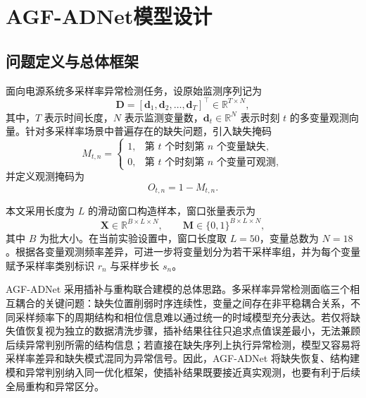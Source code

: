 \documentclass[bachelor, vlined]{DissertUESTC}
\begin{document}
    \chapter{AGF-ADNet模型设计}

    \section{问题定义与总体框架}
    
    面向电源系统多采样率异常检测任务，设原始监测序列记为
    \begin{equation}
        \mathbf{D} = [\mathbf{d}_1,\mathbf{d}_2,\ldots,\mathbf{d}_T]^\top \in \mathbb{R}^{T \times N},
    \end{equation}
    其中，$T$ 表示时间长度，$N$ 表示监测变量数，$\mathbf{d}_t \in \mathbb{R}^{N}$ 表示时刻 $t$ 的多变量观测向量。针对多采样率场景中普遍存在的缺失问题，引入缺失掩码
    \begin{equation}
        M_{t,n} =
        \begin{cases}
            1, & \text{第 $t$ 个时刻第 $n$ 个变量缺失},\\
            0, & \text{第 $t$ 个时刻第 $n$ 个变量可观测},
        \end{cases}
    \end{equation}
    并定义观测掩码为
    \begin{equation}
        O_{t,n} = 1 - M_{t,n}.
    \end{equation}
    
    本文采用长度为 $L$ 的滑动窗口构造样本，窗口张量表示为
    \begin{equation}
        \mathbf{X} \in \mathbb{R}^{B \times L \times N}, \qquad
        \mathbf{M} \in \{0,1\}^{B \times L \times N},
    \end{equation}
    其中 $B$ 为批大小。在当前实验设置中，窗口长度取 $L=50$，变量总数为 $N=18$。根据各变量观测频率差异，可进一步将变量划分为若干采样率组，并为每个变量赋予采样率类别标识 $r_n$ 与采样步长 $s_n$。
    
    AGF-ADNet 采用插补与重构联合建模的总体思路。多采样率异常检测面临三个相互耦合的关键问题：缺失位置削弱时序连续性，变量之间存在非平稳耦合关系，不同采样频率下的周期结构和相位信息难以通过统一的时域模型充分表达。若仅将缺失值恢复视为独立的数据清洗步骤，插补结果往往只追求点值误差最小，无法兼顾后续异常判别所需的结构信息；若直接在缺失序列上执行异常检测，模型又容易将采样率差异和缺失模式混同为异常信号。因此，AGF-ADNet 将缺失恢复、结构建模和异常判别纳入同一优化框架，使插补结果既要接近真实观测，也要有利于后续全局重构和异常区分。
    
\end{document}

